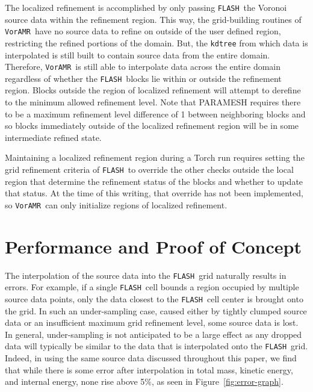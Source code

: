 \documentclass[twoside]{drexel-thesis}
\newcommand\voramr{\texttt{VorAMR}}
\newcommand\flash{\texttt{FLASH}}
\begin{document}
\begin{thesis}
The localized refinement is accomplished by only passing \flash~the Voronoi source data within the refinement region. This way, the grid-building routines of \voramr~have no source data to refine on outside of the user defined region, restricting the refined portions of the domain. But, the \texttt{kdtree} from which data is interpolated is still built to contain source data from the entire domain. Therefore, \voramr~is still able to interpolate data across the entire domain regardless of whether the \flash~blocks lie within or outside the refinement region. Blocks outside the region of localized refinement will attempt to derefine to the minimum allowed refinement level. Note that PARAMESH requires there to be a maximum refinement level difference of 1 between neighboring blocks and so blocks immediately outside of the localized refinement region will be in some intermediate refined state. 

Maintaining a localized refinement region during a Torch run requires setting the grid refinement criteria of \flash~to override the other checks outside the local region that determine the refinement status of the blocks and whether to update that status. At the time of this writing, that override has not been implemented, so \voramr~can only initialize  regions of localized refinement. 

\section{Performance and Proof of Concept}\label{sec:p2-proof}

The interpolation of the source data into the \flash~grid  naturally results in errors. For example, if a single \flash~cell bounds a region occupied by multiple source data points, only the data closest to the \flash~cell center is brought onto the grid. In such an under-sampling case, caused either by tightly clumped source data or an insufficient maximum grid refinement level, some source data is lost. In general, under-sampling is not anticipated to be a large effect as any dropped data will typically be similar to the data that is interpolated onto the \flash~grid. Indeed, in using the same source data discussed throughout this paper, we find that while there is some error after interpolation in total mass, kinetic energy, and internal energy, none rise above 5\%, as seen in Figure~\ref{fig:error-graph}. 


\end{thesis}
\end{document}
